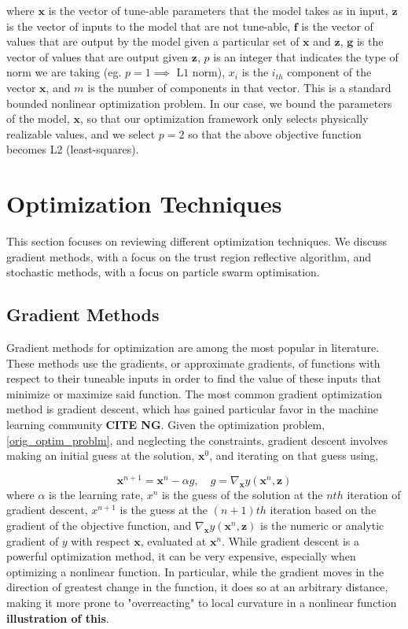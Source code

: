 where $\mathbf{x}$ is the vector of tune-able parameters that the model takes as in input, $\mathbf{z}$ is the vector of inputs to the model that are not tune-able, $\mathbf{f}$ is the vector of values that are output by the model given a particular set of $\mathbf{x}$ and $\mathbf{z}$, $\mathbf{g}$ is the vector of values that are output given $\mathbf{z}$, $p$ is an integer that indicates the type of norm we are taking (eg. $p=1 \implies \textrm{ L1 norm}$), $x_i$ is the $i_{th}$ component of the vector $\mathbf{x}$, and $m$ is the number of components in that vector. This is a standard bounded nonlinear optimization problem. In our case, we bound the parameters of the model, $\mathbf{x}$, so that our optimization framework only selects physically realizable values, and we select $p=2$ so that the above objective function becomes L2 (least-squares).

\section{Optimization Techniques}
This section focuses on reviewing different optimization techniques. We discuss gradient methods, with a focus on the trust region reflective algorithm, and stochastic methods, with a focus on particle swarm optimisation. 

\subsection{Gradient Methods}

Gradient methods for optimization are among the most popular in literature. These methods use the gradients, or approximate gradients, of functions with respect to their tuneable inputs in order to find the value of these inputs that minimize or maximize said function. The most common gradient optimization method is gradient descent, which has gained particular favor in the machine learning community \textbf{CITE NG}. Given the optimization problem, \ref{orig_optim_problm}, and neglecting the constraints, gradient descent involves making an initial guess at the solution, $\mathbf{x}^{0}$, and iterating on that guess using,

\begin{equation} \label{grad_descent}
    \mathbf{x}^{n+1} = \mathbf{x}^{n} - \alpha g, \quad g = \nabla_\mathbf{x} y(\mathbf{x}^{n},\mathbf{z})
\end{equation}
where $\alpha$ is the learning rate, $x^{n}$ is the guess of the solution at the $nth$ iteration of gradient descent, $x^{n+1}$ is the guess at the $(n+1)th$ iteration based on the gradient of the objective function, and $\nabla_\mathbf{x} y(\mathbf{x}^{n},\mathbf{z})$ is the numeric or analytic gradient of $y$ with respect $\mathbf{x}$, evaluated at $\mathbf{x}^{n}$. While gradient descent is a powerful optimization method, it can be very expensive, especially when optimizing a nonlinear function. In particular, while the gradient moves in the direction of greatest change in the function, it does so at an arbitrary distance, making it more prone to "overreacting" to local curvature in a nonlinear function \textbf{illustration of this}.

